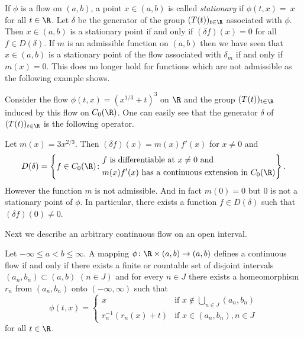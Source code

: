 \begin{remark}\label{rem:b2-3.19}
%
If\/ $\phi$ is a flow on $(a,b)$, a point $x \in (a,b)$ is called \emph{stationary} if\/ $\phi(t,x) =~x$ for all $t \in \R$.
Let $\delta$ be the generator of the group $(T(t))_{t \in \R}$ associated with $\phi$.
Then $x \in (a,b)$ is a stationary point if and only if\/ $(\delta f)(x) = 0$ for all $f \in D(\delta)$.
If\/ $m$ is an admissible function on $(a,b)$ then we have seen that $x \in (a,b)$ is a stationary point of the flow associated with $\delta_{m}$ if and only if\/ $m(x) = 0$.
This does no longer hold for functions which are not admissible as the following example shows.
\end{remark}
\begin{example}\label{ex:b2-3.20}
%
Consider the flow $\phi(t,x) = (x^{1/3} + t)^{3}$ on $\R$ and the group $(T(t))_{t \in \R}$ induced by this flow on $C_{0}(\R)$.
One can easily see that the generator $\delta$ of\/ $(T(t))_{t \in \R}$ is the following operator.

Let $m(x) = 3x^{2/3}$.
Then $(\delta f)(x) = m(x)f'(x)$ for $x \neq 0$ and 
\begin{equation*}
D(\delta) = 
\left\{ f \in C_{0}(\R) \colon 
\begin{aligned}
	&f \text{ is differentiable at } x \neq 0 \text{ and } \\
	&m(x)f'(x) \text{ has a continuous extension in } C_{0}(\R)
\end{aligned}
\right\}.
\end{equation*}
However the function $m$ is not admissible.
And in fact $m(0) = 0$ but $0$ is not a stationary point of\/ $\phi$.
In particular, there exists a function $f \in D(\delta)$ such that $(\delta f)(0) \neq 0$.
\end{example}
Next we describe an arbitrary continuous flow on an open interval.
\begin{proposition}\label{prop:b2-3.21}
%
Let $-\infty \leq a < b \leq \infty$.
A mapping $\phi \colon \R \times (a,b) \to (a,b)$ defines a continuous flow if and only if there exists a finite or countable set of disjoint intervals $(a_{n},b_{n}) \subset (a,b)$ $(n \in J)$ and for every $n \in J$ there exists a homeomorphism $r_{n}$ from $(a_{n},b_{n})$ onto $(-\infty,\infty)$ such that
\begin{equation*}\label{eq:b2-flow}
\phi(t,x) = \begin{cases}
    x & \text{if } x \notin \bigcup_{n \in J} (a_{n},b_{n}) \\
    r_{n}^{-1}(r_{n}(x) + t) & \text{if } x \in (a_{n},b_{n}), n \in J
\end{cases}
\end{equation*}
for all $t \in \R$.
\end{proposition}
